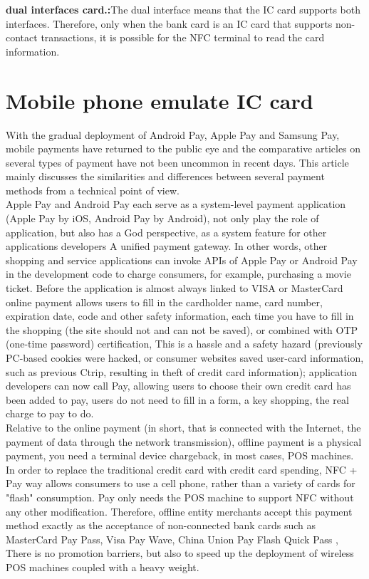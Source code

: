 \documentclass[journal]{IEEEtran}
\begin{document}
\textbf{dual interfaces card.:}The dual interface means that the IC card supports both interfaces. Therefore, only when the bank card is an IC card that supports non-contact transactions, it is possible for the NFC terminal to read the card information.







\section{Mobile phone emulate IC card}
With the gradual deployment of Android Pay, Apple Pay and Samsung Pay, mobile payments have returned to the public eye and the comparative articles on several types of payment have not been uncommon in recent days. This article mainly discusses the similarities and differences between several payment methods from a technical point of view.
\\

Apple Pay and Android Pay each serve as a system-level payment application (Apple Pay by iOS, Android Pay by Android), not only play the role of application, but also has a God perspective, as a system feature for other applications developers A unified payment gateway. In other words, other shopping and service applications can invoke APIs of Apple Pay or Android Pay in the development code to charge consumers, for example, purchasing a movie ticket. Before the application is almost always linked to VISA or MasterCard online payment allows users to fill in the cardholder name, card number, expiration date, code and other safety information, each time you have to fill in the shopping (the site should not and can not be saved), or combined with OTP (one-time password) certification, This is a hassle and a safety hazard (previously PC-based cookies were hacked, or consumer websites saved user-card information, such as previous Ctrip, resulting in theft of credit card information); application developers can now call Pay, allowing users to choose their own credit card has been added to pay, users do not need to fill in a form, a key shopping, the real charge to pay to do.\\

Relative to the online payment (in short, that is connected with the Internet, the payment of data through the network transmission), offline payment is a physical payment, you need a terminal device chargeback, in most cases, POS machines. In order to replace the traditional credit card with credit card spending, NFC + Pay way allows consumers to use a cell phone, rather than a variety of cards for "flash" consumption. Pay only needs the POS machine to support NFC without any other modification. Therefore, offline entity merchants accept this payment method exactly as the acceptance of non-connected bank cards such as MasterCard Pay Pass, Visa Pay Wave, China Union Pay Flash Quick Pass , There is no promotion barriers, but also to speed up the deployment of wireless POS machines coupled with a heavy weight.
\end{document}
